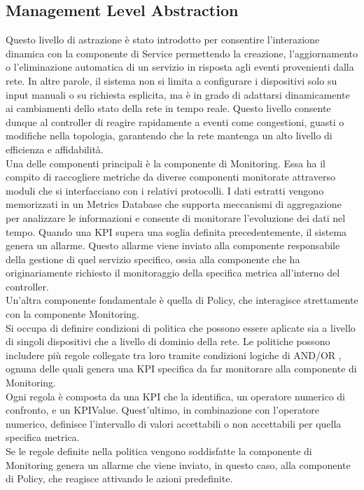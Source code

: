\subsection{Management Level Abstraction}
Questo livello di astrazione è stato introdotto per consentire l'interazione dinamica con la componente di Service permettendo la creazione, l'aggiornamento o l'eliminazione automatica di un servizio in risposta agli eventi provenienti dalla rete.
In altre parole, il sistema non si limita a configurare i dispositivi solo su input manuali o su richiesta esplicita, ma è in grado di adattarsi dinamicamente ai cambiamenti dello stato della rete in tempo reale. 
Questo livello consente dunque al controller di reagire rapidamente a eventi come congestioni, guasti o modifiche nella topologia, garantendo che la rete mantenga un alto livello di efficienza e affidabilità.
\\Una delle componenti principali è la componente di Monitoring. Essa ha il compito di raccogliere metriche da diverse componenti
monitorate attraverso moduli che si interfacciano con i relativi protocolli.
I dati estratti vengono memorizzati in un Metrics Database che supporta meccanismi di aggregazione per analizzare le informazioni e consente di monitorare l'evoluzione dei dati nel tempo.
Quando una KPI supera una soglia definita precedentemente, il sistema genera un allarme.
Questo allarme viene inviato alla componente responsabile della gestione di quel servizio specifico, ossia alla componente che ha originariamente richiesto il monitoraggio della specifica metrica all'interno del controller.
\\Un'altra componente fondamentale è quella di Policy, che interagisce strettamente con la componente Monitoring.
\\Si occupa di definire condizioni di politica che possono essere aplicate sia a livello di singoli dispositivi che a livello di dominio della rete.
Le politiche possono includere più regole collegate tra loro tramite condizioni logiche di AND/OR \cite{D32}, ognuna delle quali genera una KPI specifica da far monitorare alla componente di Monitoring.
\\Ogni regola è composta da una KPI che la identifica, un operatore numerico di confronto, e un KPIValue.
Quest'ultimo, in combinazione con l'operatore numerico, definisce l'intervallo di valori accettabili o non accettabili per quella specifica metrica.
\\Se le regole definite nella politica vengono soddisfatte la componente di Monitoring genera un allarme che viene inviato, in questo caso, alla componente di Policy, che reagisce attivando le azioni predefinite.
